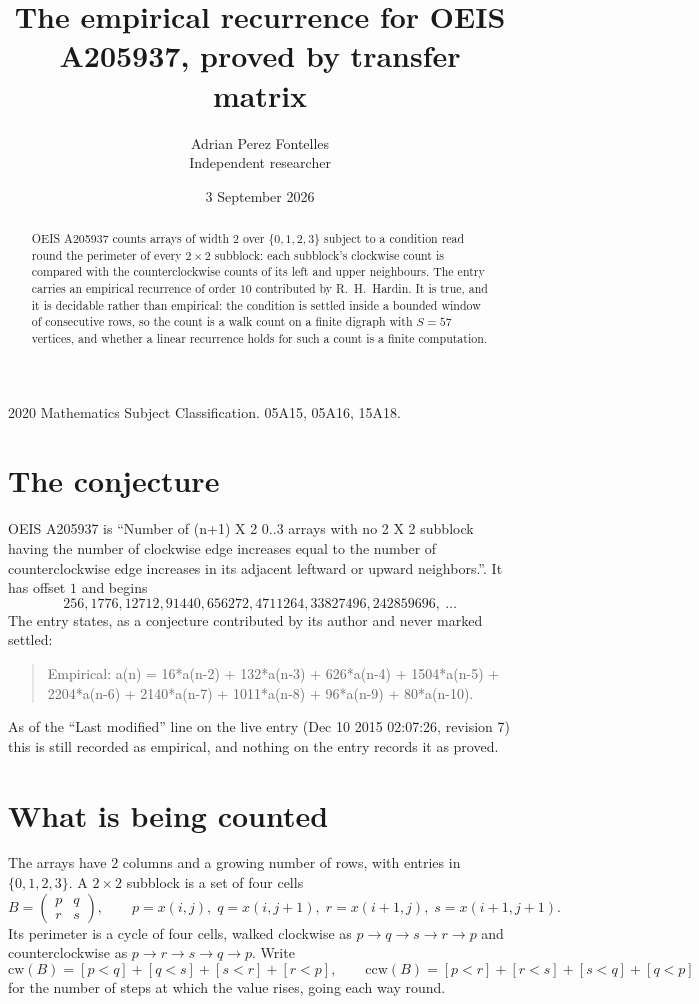 \documentclass[11pt,a4paper]{article}
\title{The empirical recurrence for OEIS A205937, proved by transfer matrix}
\author{Adrian Perez Fontelles\\ \small Independent researcher}
\date{3 September 2026}
\theoremstyle{plain}
\theoremstyle{definition}
\begin{document}
\maketitle

\begin{abstract}
OEIS A205937 counts arrays of width $2$ over $\{0,1,2,3\}$ subject to a condition read round the
perimeter of every $2\times2$ subblock: each subblock's clockwise count is compared with the counterclockwise counts of its left and upper neighbours. The entry carries an empirical recurrence of
order $10$ contributed by R.~H.~Hardin. It is true, and it is decidable rather than
empirical: the condition is settled inside a bounded window of consecutive rows, so the
count is a walk count on a finite digraph with $S=57$ vertices, and whether a linear
recurrence holds for such a count is a finite computation.
\end{abstract}

\noindent\small 2020 Mathematics Subject Classification. 05A15, 05A16, 15A18.\normalsize

\section{The conjecture}

OEIS A205937 is ``Number of (n+1) X 2 0..3 arrays with no 2 X 2 subblock having the number of clockwise edge increases equal to the number of counterclockwise edge increases in its adjacent leftward or upward neighbors.''. It has offset $1$ and begins
\[
256, 1776, 12712, 91440, 656272, 4711264, 33827496, 242859696,\ \dots
\]
The entry states, as a conjecture contributed by its author and never marked settled:
\begin{quote}
Empirical: a(n) = 16*a(n-2) + 132*a(n-3) + 626*a(n-4) + 1504*a(n-5) + 2204*a(n-6) + 2140*a(n-7) + 1011*a(n-8) + 96*a(n-9) + 80*a(n-10).
\end{quote}
As of the ``Last modified'' line on the live entry (Dec 10 2015 02:07:26, revision 7) this is still
recorded as empirical, and nothing on the entry records it as proved.

\section{What is being counted}

The arrays have $2$ columns and a growing number of rows, with entries in $\{0,1,2,3\}$. A
$2\times2$ subblock is a set of four cells
\[
B=\begin{pmatrix} p & q \\ r & s \end{pmatrix},
\qquad p=x(i,j),\; q=x(i,j+1),\; r=x(i+1,j),\; s=x(i+1,j+1).
\]
Its perimeter is a cycle of four cells, walked clockwise as $p\to q\to s\to r\to p$ and
counterclockwise as $p\to r\to s\to q\to p$. Write
\[
\mathrm{cw}(B)=[p<q]+[q<s]+[s<r]+[r<p],\qquad
\mathrm{ccw}(B)=[p<r]+[r<s]+[s<q]+[q<p]
\]
for the number of steps at which the value rises, going each way round.
\end{document}
